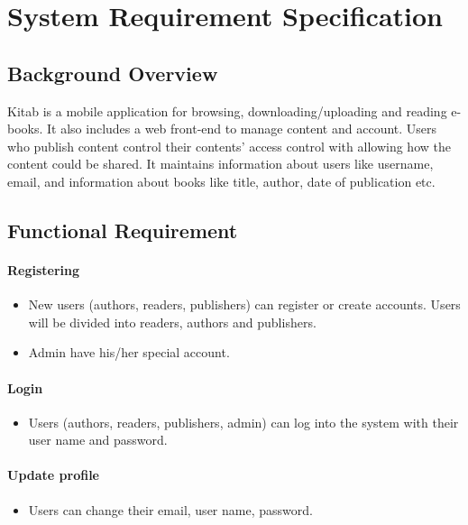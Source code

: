 \chapter{System Requirement Specification}
\section{Background Overview}

Kitab is a mobile application for browsing, downloading/uploading and reading e-books. It also includes a web front-end to manage content and account. Users who publish content control their contents’ access control with allowing how the content could be shared. It maintains information about users like username, email, and information about books like title, author, date of publication etc.

\section{Functional Requirement}
	\subsubsection{Registering}

	\begin{itemize}
		\item New users (authors, readers, publishers) can register or create accounts. Users will be divided into readers, authors and publishers.
		\item Admin have his/her special account.
	\end{itemize}

	\subsubsection{Login}
	\begin{itemize}
		\item Users (authors, readers, publishers, admin) can log into the system with their user name and password.
	\end{itemize}

	\subsubsection{Update profile}	
	\begin{itemize}
		\item Users can change their email, user name, password.
	\end{itemize}

